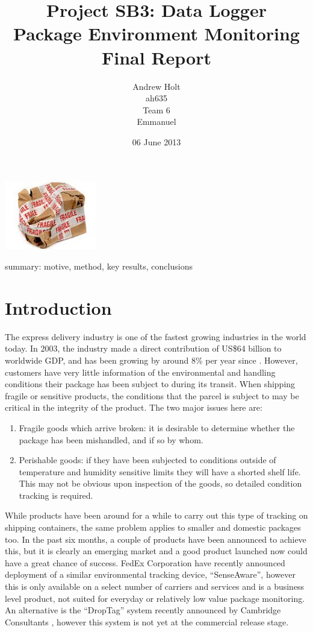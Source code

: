 \documentclass[a4paper,10pt]{article}  %
\title{Project SB3: Data Logger\\
       Package Environment Monitoring\\
       Final Report}
\author{Andrew Holt\\
        ah635\\
        Team 6\\
        Emmanuel}
\date{06 June 2013}
\begin{document}
\maketitle

\begin{center}
  \includegraphics[width=0.3\textwidth]{damaged_parcel.jpg}
\end{center}

\noindent summary: motive, method, key results, conclusions

\tableofcontents

\section{Introduction}
\label{sec:introduction}

The express delivery industry is one of the fastest growing industries
in the world today. In 2003, the industry made a direct contribution
of US\$64 billion to worldwide GDP, and has been growing by around 8\%
per year since \cite{OEF2005}. However, customers have very little
information of the environmental and handling conditions their package
has been subject to during its transit. When shipping fragile or
sensitive products, the conditions that the parcel is subject to may
be critical in the integrity of the product. The two major issues here
are:
\begin{enumerate}
\item Fragile goods which arrive broken: it is desirable to determine
  whether the package has been mishandled, and if so by whom.
\item Perishable goods: if they have been subjected to conditions
  outside of temperature and humidity sensitive limits they will have
  a shorted shelf life. This may not be obvious upon inspection of the
  goods, so detailed condition tracking is required.
\end{enumerate}
While products have been around for a while to carry out this type of
tracking on shipping containers, the same problem applies to smaller
and domestic packages too. In the past six months, a couple of
products have been announced to achieve this, but it is clearly an
emerging market and a good product launched now could have a great
chance of success. FedEx Corporation have recently announced
deployment of a similar environmental tracking device,
``SenseAware''\cite{SA_PR}, however this is only available on a select
number of carriers and services and is a business level product, not
suited for everyday or relatively low value package monitoring. An
alternative is the ``DropTag'' system recently announced by Cambridge
Consultants \cite{DT_PR}, however this system is not yet at the
commercial release stage.
\end{document}
